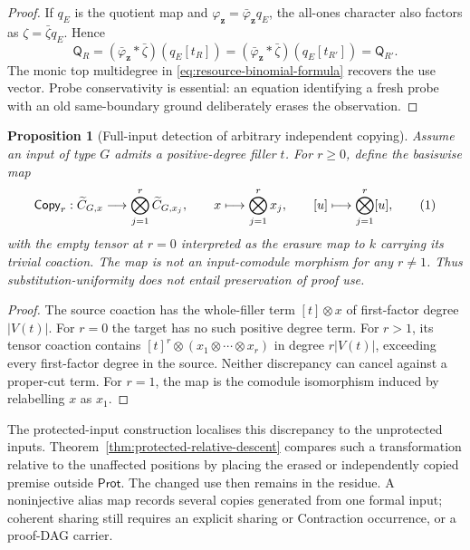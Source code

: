 \documentclass[10pt,a4paper]{article}
\theoremstyle{plain}
\newtheorem{proposition}[theorem]{Proposition}
\theoremstyle{definition}
\theoremstyle{remark}
\newcommand{\eqtag}{\refstepcounter{equation}\tag{\theequation}}
\begin{document}
\begin{proof}
If \(q_E\) is the quotient map and
\(\varphi_{\mathbf z}=\bar\varphi_{\mathbf z}q_E\), the all-ones character
also factors as \(\zeta=\bar\zeta q_E\).  Hence
\[
 \mathsf Q_R
   =(\bar\varphi_{\mathbf z}*\bar\zeta)(q_E[t_R])
   =(\bar\varphi_{\mathbf z}*\bar\zeta)(q_E[t_{R'}])
   =\mathsf Q_{R'}.
\]
The monic top multidegree in
\eqref{eq:resource-binomial-formula} recovers the use vector.  Probe
conservativity is essential: an equation identifying a fresh probe with
an old same-boundary ground deliberately erases the observation.
\end{proof}

\begin{proposition}[Full-input detection of arbitrary independent copying]
\label{prop:input-use}
Assume an input of type \(G\) admits a positive-degree filler \(t\).  For
\(r\ge0\), define the basiswise map
\[
 \mathsf{Copy}_r:\widetilde C_{G,x}\longrightarrow
       \bigotimes_{j=1}^{r}\widetilde C_{G,x_j},
 \qquad
 x\longmapsto\bigotimes_{j=1}^{r}x_j,\qquad
 [u]\longmapsto\bigotimes_{j=1}^{r}[u],
\eqtag\label{eq:r-fold-independent-copying}
\]
with the empty tensor at \(r=0\) interpreted as the erasure map to \(k\)
carrying its trivial coaction.  The map is not an
input-comodule morphism for any \(r\ne1\).  Thus substitution-uniformity
does not entail preservation of proof use.
\end{proposition}

\begin{proof}
The source coaction has the whole-filler term \([t]\otimes x\) of
first-factor degree \(|V(t)|\).  For \(r=0\) the target has no such positive
degree term.  For \(r>1\), its tensor coaction contains
\([t]^r\otimes(x_1\otimes\cdots\otimes x_r)\) in degree
\(r|V(t)|\), exceeding every first-factor degree in the source.  Neither
discrepancy can cancel against a proper-cut term.  For \(r=1\), the map is
the comodule isomorphism induced by relabelling \(x\) as \(x_1\).
\end{proof}

The protected-input construction localises this discrepancy to the
unprotected inputs.  Theorem~\ref{thm:protected-relative-descent} compares
such a transformation relative to the unaffected positions by placing the
erased or independently copied premise outside \(\mathsf{Prot}\).  The
changed use then remains in the residue.  A noninjective alias map records
several copies generated from one formal input; coherent sharing still
requires an explicit sharing or Contraction occurrence, or a proof-DAG
carrier.
\end{document}

